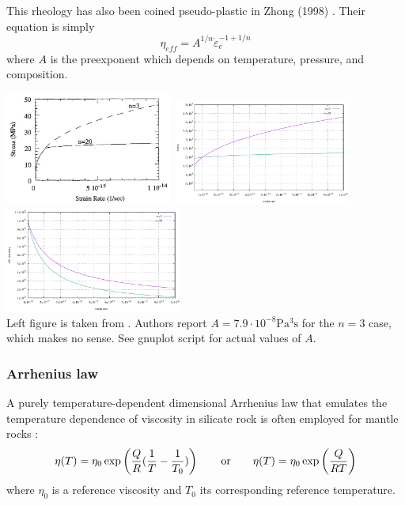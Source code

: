 This rheology has also been coined pseudo-plastic in Zhong \etal (1998) \cite{zhgm98}. 
Their equation is simply  
\[
\eta_{eff} = A^{1/n} \dot{\varepsilon}_e^{-1+1/n}
\]
where $A$ is the preexponent which depends on temperature, pressure, and composition.
\begin{center}
\includegraphics[width=5.5cm]{images/rheology/zhgm98}
\includegraphics[width=5.8cm]{images/rheology/pseudoplastic/stress}
\includegraphics[width=5.8cm]{images/rheology/pseudoplastic/eta_eff}\\
{\captionfont Left figure is taken from \cite{zhgm98}. Authors report $A=7.9\cdot 10^{-8} \si{\pascal^3\second}$ 
for the $n=3$ case, which makes no sense. See gnuplot script for actual values of $A$.}
\end{center}




\subsubsection{Arrhenius law}

A purely temperature-dependent dimensional Arrhenius law that emulates the temperature
dependence of viscosity in silicate rock is often employed for mantle rocks 
\cite{albe00,zhzm09,vata11,bogs13b,namu13,stha13,boba19,gult19}:
\begin{equation}
\eta(T)=\eta_0 \exp \left( \frac{Q}{R}(\frac{1}{T}-\frac{1}{T_0}) \right)
\qquad 
{\rm or}
\qquad 
\eta(T)=\eta_0 \exp \left( \frac{Q}{RT} \right)
\end{equation}
where $\eta_0$ is a reference viscosity and $T_0$ its corresponding reference 
temperature.

